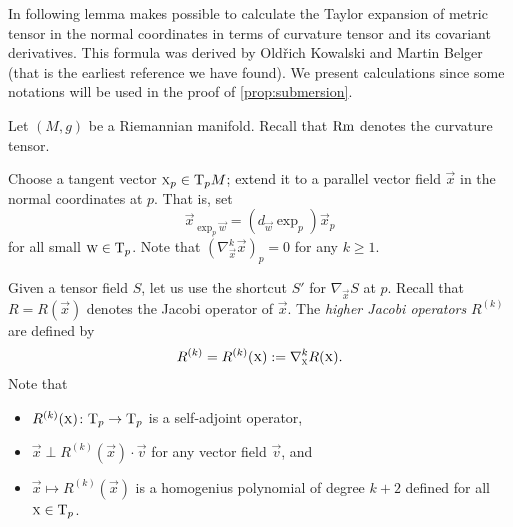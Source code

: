 \documentclass[a4paper,10pt]{article}
\begin{document}
In following lemma makes possible to calculate the Taylor expansion of metric tensor in the normal coordinates in terms of curvature tensor and its covariant derivatives.
This formula was derived by Old\v{r}ich Kowalski and Martin Belger \cite[Proposition 2.2]{kowalski-belger} (that is the earliest reference we have found).
We present calculations since some notations will be used in the proof of \ref{prop:submersion}.

Let $(M,g)$ be a Riemannian manifold.
Recall that $\operatorname{\rm Rm}$ denotes the curvature tensor.

Choose a tangent vector $\text{\sc{x}}_p\in \mathrm{T}_pM$; 
extend it to a parallel vector field $\vec{x}$ in the normal coordinates at $p$.
That is, set 
\[\vec{x}_{\exp_p\vec{w}}=(d_\vec{w}\exp_p)\vec{x}_p\] for all small $\text{\sc{w}}\in \mathrm{T}_p$.
Note that $(\nabla^k_\vec{x} \vec{x})_p=0$ for any $k\ge 1$.

Given a tensor field $S$, let us use the shortcut $S'$ for $\nabla_\vec{x}S$ at $p$.
Recall that $R=R(\vec{x})$ denotes the Jacobi operator of $\vec{x}$.
The \emph{higher Jacobi operators} $R^{(k)}$ are defined by
\[R^{(k)}=R^{(k)}(\text{\sc{x}})\mathrel{{:}{=}}\nabla^k_{\text{\sc{x}}}R(\text{\sc{x}}).\]
Note that 
\begin{itemize}
\item $R^{(k)}(\text{\sc{x}})\colon\mathrm{T}_p\to\mathrm{T}_p$ is a self-adjoint operator, 
\item $\vec{x}\perp R^{(k)}(\vec{x})\cdot \vec{v}$ for any vector field $\vec{v}$, and
\item $\vec{x}\mapsto R^{(k)}(\vec{x})$ is a homogenius polynomial of degree $k+2$ defined for all $\text{\sc{x}}\in \mathrm{T}_p$.
\end{itemize}
\end{document}
